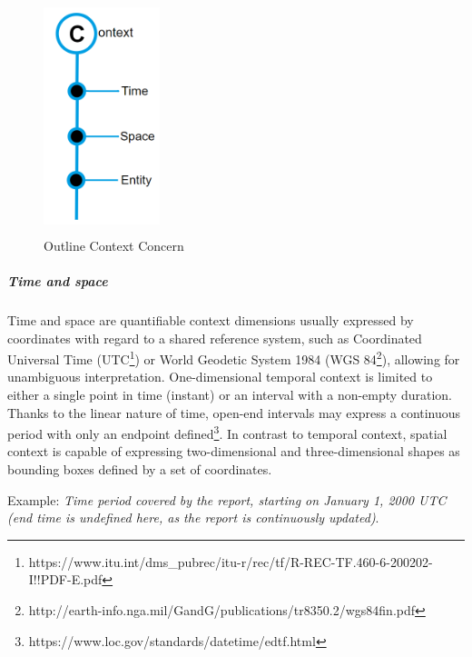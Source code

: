 \begin{figure}[H]
	\begin{Center}
		\includegraphics[width=1.33in,height=2.68in]{./media/image37.png}
		\caption{Outline Context Concern}
		\label{fig:outline_context_concern}
	\end{Center}
\end{figure} 


\subparagraph*{Time and space}
Time and space are quantifiable context dimensions usually expressed by coordinates with regard to a shared reference system, such as Coordinated Universal Time (UTC\footnote{https://www.itu.int/dms\_pubrec/itu-r/rec/tf/R-REC-TF.460-6-200202-I!!PDF-E.pdf }) or World Geodetic System 1984 (WGS 84\footnote{http://earth-info.nga.mil/GandG/publications/tr8350.2/wgs84fin.pdf }), allowing for unambiguous interpretation. One-dimensional temporal context is limited to either a single point in time (instant) or an interval with a non-empty duration. Thanks to the linear nature of time, open-end intervals may express a continuous period with only an endpoint defined\footnote{https://www.loc.gov/standards/datetime/edtf.html }. In contrast to temporal context, spatial context is capable of expressing two-dimensional and three-dimensional shapes as bounding boxes defined by a set of coordinates. 

Example: \textit{Time period covered by the report, starting on January 1, 2000 UTC (end time is undefined here, as the report is continuously updated)}. 


